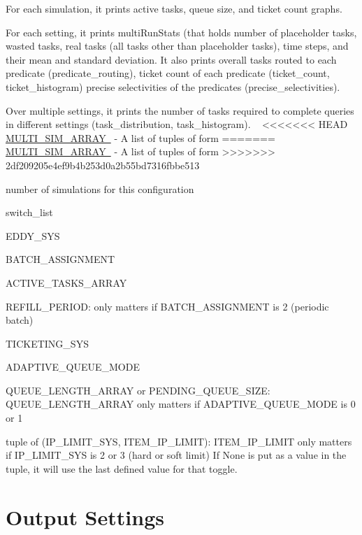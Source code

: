\begin{DoxyItemize}
\item For each simulation, it prints active tasks, queue size, and ticket count graphs.
\item For each setting, it prints multi\+Run\+Stats (that holds number of placeholder tasks, wasted tasks, real tasks (all tasks other than placeholder tasks), time steps, and their mean and standard deviation. It also prints overall tasks routed to each predicate (predicate\+\_\+routing), ticket count of each predicate (ticket\+\_\+count, ticket\+\_\+histogram) precise selectivities of the predicates (precise\+\_\+selectivities).
\item Over multiple settings, it prints the number of tasks required to complete queries in different settings (task\+\_\+distribution, task\+\_\+histogram). ~\newline
<<<<<<< HEAD
 \mbox{\hyperlink{namespacedynamicfilterapp_1_1toggles_a220d8cf87bacce3b4d63c494c95b918e}{M\+U\+L\+T\+I\+\_\+\+S\+I\+M\+\_\+\+A\+R\+R\+AY }} -\/ A list of tuples of form
=======
 \mbox{\hyperlink{}{M\+U\+L\+T\+I\+\_\+\+S\+I\+M\+\_\+\+A\+R\+R\+AY }} -\/ A list of tuples of form
>>>>>>> 2df209205e4ef9b4b253d0a2b55bd7316fbbe513
\item number of simulations for this configuration
\item switch\+\_\+list
\item E\+D\+D\+Y\+\_\+\+S\+YS
\item B\+A\+T\+C\+H\+\_\+\+A\+S\+S\+I\+G\+N\+M\+E\+NT
\item A\+C\+T\+I\+V\+E\+\_\+\+T\+A\+S\+K\+S\+\_\+\+A\+R\+R\+AY
\item R\+E\+F\+I\+L\+L\+\_\+\+P\+E\+R\+I\+OD\+: only matters if B\+A\+T\+C\+H\+\_\+\+A\+S\+S\+I\+G\+N\+M\+E\+NT is 2 (periodic batch)
\item T\+I\+C\+K\+E\+T\+I\+N\+G\+\_\+\+S\+YS
\item A\+D\+A\+P\+T\+I\+V\+E\+\_\+\+Q\+U\+E\+U\+E\+\_\+\+M\+O\+DE
\item Q\+U\+E\+U\+E\+\_\+\+L\+E\+N\+G\+T\+H\+\_\+\+A\+R\+R\+AY or P\+E\+N\+D\+I\+N\+G\+\_\+\+Q\+U\+E\+U\+E\+\_\+\+S\+I\+ZE\+: Q\+U\+E\+U\+E\+\_\+\+L\+E\+N\+G\+T\+H\+\_\+\+A\+R\+R\+AY only matters if A\+D\+A\+P\+T\+I\+V\+E\+\_\+\+Q\+U\+E\+U\+E\+\_\+\+M\+O\+DE is 0 or 1
\item tuple of (I\+P\+\_\+\+L\+I\+M\+I\+T\+\_\+\+S\+YS, I\+T\+E\+M\+\_\+\+I\+P\+\_\+\+L\+I\+M\+IT)\+: I\+T\+E\+M\+\_\+\+I\+P\+\_\+\+L\+I\+M\+IT only matters if I\+P\+\_\+\+L\+I\+M\+I\+T\+\_\+\+S\+YS is 2 or 3 (hard or soft limit) If None is put as a value in the tuple, it will use the last defined value for that toggle.
\end{DoxyItemize}\hypertarget{toggles_output}{}\section{Output Settings}\label{toggles_output}
